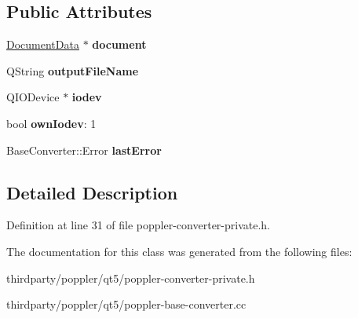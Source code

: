 \subsection*{Public Attributes}
\begin{DoxyCompactItemize}
\item 
\mbox{\label{class_poppler_1_1_base_converter_private_ab2e150cd7489de16607ad028531c077e}} 
\hyperlink{class_poppler_1_1_document_data}{Document\+Data} $\ast$ {\bfseries document}
\item 
\mbox{\label{class_poppler_1_1_base_converter_private_a68b413210df02cd941774a94569363d3}} 
Q\+String {\bfseries output\+File\+Name}
\item 
\mbox{\label{class_poppler_1_1_base_converter_private_ab7a21e017dcd695685d41caa67a1ad49}} 
Q\+I\+O\+Device $\ast$ {\bfseries iodev}
\item 
\mbox{\label{class_poppler_1_1_base_converter_private_a89c61afc48c6ea9da0d15322943b7c14}} 
bool {\bfseries own\+Iodev}\+: 1
\item 
\mbox{\label{class_poppler_1_1_base_converter_private_adc4d5425cb7c7ffe9d746cb4e05e3b6e}} 
Base\+Converter\+::\+Error {\bfseries last\+Error}
\end{DoxyCompactItemize}


\subsection{Detailed Description}


Definition at line 31 of file poppler-\/converter-\/private.\+h.



The documentation for this class was generated from the following files\+:\begin{DoxyCompactItemize}
\item 
thirdparty/poppler/qt5/poppler-\/converter-\/private.\+h\item 
thirdparty/poppler/qt5/poppler-\/base-\/converter.\+cc\end{DoxyCompactItemize}
